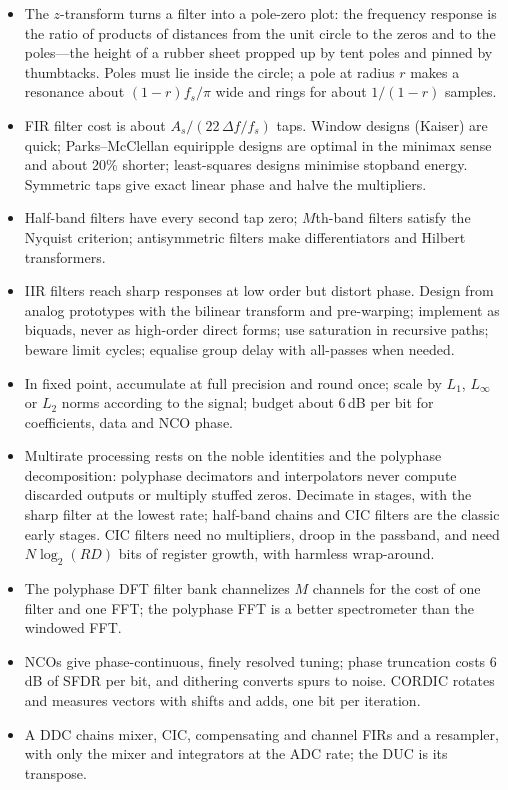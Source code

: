 \begin{itemize}
\item The $z$-transform turns a filter into a pole-zero plot: the frequency response is the ratio of
products of distances from the unit circle to the zeros and to the poles---the height of a rubber
sheet propped up by tent poles and pinned by thumbtacks. Poles must lie inside the circle; a pole at
radius $r$ makes a resonance about $(1-r)f_s/\pi$ wide and rings for about $1/(1-r)$ samples.
\item FIR filter cost is about $A_s/(22\,\Delta f/f_s)$ taps. Window designs (Kaiser) are quick;
Parks--McClellan equiripple designs are optimal in the minimax sense and about 20\% shorter;
least-squares designs minimise stopband energy. Symmetric taps give exact linear phase and halve the
multipliers.
\item Half-band filters have every second tap zero; $M$th-band filters satisfy the Nyquist
criterion; antisymmetric filters make differentiators and Hilbert transformers.
\item IIR filters reach sharp responses at low order but distort phase. Design from analog prototypes
with the bilinear transform and pre-warping; implement as biquads, never as high-order direct forms;
use saturation in recursive paths; beware limit cycles; equalise group delay with all-passes when
needed.
\item In fixed point, accumulate at full precision and round once; scale by $L_1$, $L_\infty$ or $L_2$
norms according to the signal; budget about 6\,dB per bit for coefficients, data and NCO phase.
\item Multirate processing rests on the noble identities and the polyphase decomposition: polyphase
decimators and interpolators never compute discarded outputs or multiply stuffed zeros. Decimate in
stages, with the sharp filter at the lowest rate; half-band chains and CIC filters are the classic
early stages. CIC filters need no multipliers, droop in the passband, and need $N\log_2(RD)$ bits of
register growth, with harmless wrap-around.
\item The polyphase DFT filter bank channelizes $M$ channels for the cost of one filter and one FFT;
the polyphase FFT is a better spectrometer than the windowed FFT.
\item NCOs give phase-continuous, finely resolved tuning; phase truncation costs 6\,dB of SFDR per bit,
and dithering converts spurs to noise. CORDIC rotates and measures vectors with shifts and adds, one
bit per iteration.
\item A DDC chains mixer, CIC, compensating and channel FIRs and a resampler, with only the mixer and
integrators at the ADC rate; the DUC is its transpose.
\end{itemize}

